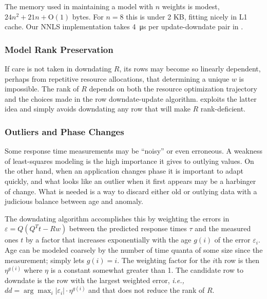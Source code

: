 The memory used in maintaining a model with $n$ weights is modest, $24n^2 + 21n + \textrm{O}(1)$ bytes.
For $n = 8$ this is under 2 KB, fitting nicely in L1 cache.
Our NNLS implementation takes \SI{4}{\micro\second} per update-downdate pair in \tess.

\subsubsection*{Model Rank Preservation}
If care is not taken in downdating $R$, its rows may become so linearly dependent,
perhaps from repetitive resource allocations,
that determining a unique $w$ is impossible.
The rank of $R$ depends on both the resource optimization trajectory and the
choices made in the row downdate-update algorithm.
\pacora exploits the latter idea and simply avoids downdating any row that will make $R$ rank-deficient.

\subsubsection*{Outliers and Phase Changes}


Some response time measurements may be ``noisy'' or even erroneous.
A weakness of least-squares modeling is the high importance it gives to outlying values.
On the other hand, when an application changes phase it is important to adapt quickly,
and what looks like an outlier when it first appears may be a harbinger of change.
What is needed is a way to discard either old or outlying data
with a judicious balance between age and anomaly.

The downdating algorithm accomplishes this by weighting the errors in $\varepsilon = Q(Q^Tt - Rw)$
between the predicted response times $\tau$ and the measured ones $t$ by a factor
that increases exponentially with the age $g(i)$ of the error $\varepsilon_i$.
Age can be modeled coarsely by the number of time quanta of some size since the measurement;
\pacora simply lets $g(i) = i$.
The weighting factor for the $i$th row is then $\eta^{g(i)}$ where $\eta$ is a constant somewhat greater than 1.
The candidate row to downdate is the row with the largest weighted error, \emph{i.e.,}
$dd = \arg\max_i |\varepsilon_i| \cdot \eta^{g(i)}$ and that does not reduce the rank of $R$.


